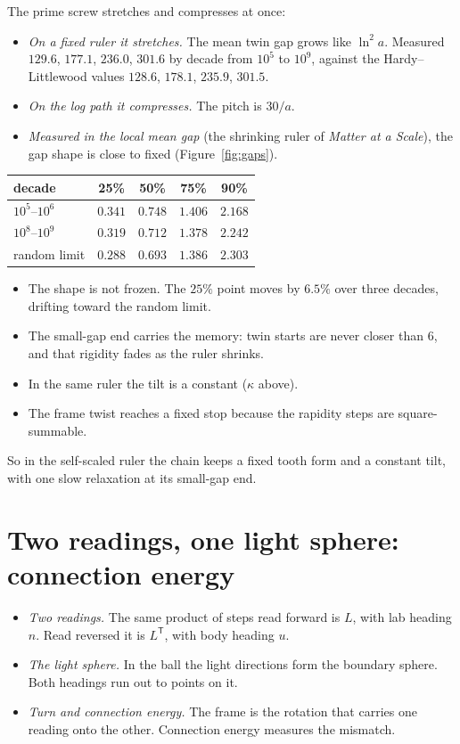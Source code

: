 \documentclass[11pt]{article}
\theoremstyle{definition}
\theoremstyle{remark}
\begin{document}
The prime screw stretches and compresses at once:
\begin{itemize}
\item \emph{On a fixed ruler it stretches.} The mean twin gap grows like $\ln^2a$. Measured $129.6$, $177.1$, $236.0$, $301.6$ by decade from $10^5$ to $10^9$, against the Hardy--Littlewood values $128.6$, $178.1$, $235.9$, $301.5$.
\item \emph{On the log path it compresses.} The pitch is $30/a$.
\item \emph{Measured in the local mean gap} (the shrinking ruler of \emph{Matter at a Scale}), the gap shape is close to fixed (Figure~\ref{fig:gaps}).
\end{itemize}

\begin{center}
\begin{tabular}{lcccc}
\toprule
decade & 25\% & 50\% & 75\% & 90\%\\
\midrule
$10^5$--$10^6$ & $0.341$ & $0.748$ & $1.406$ & $2.168$\\
$10^8$--$10^9$ & $0.319$ & $0.712$ & $1.378$ & $2.242$\\
random limit & $0.288$ & $0.693$ & $1.386$ & $2.303$\\
\bottomrule
\end{tabular}
\end{center}

\begin{itemize}
\item The shape is not frozen. The $25\%$ point moves by $6.5\%$ over three decades, drifting toward the random limit.
\item The small-gap end carries the memory: twin starts are never closer than $6$, and that rigidity fades as the ruler shrinks.
\item In the same ruler the tilt is a constant ($\kappa$ above).
\item The frame twist reaches a fixed stop because the rapidity steps are square-summable.
\end{itemize}
So in the self-scaled ruler the chain keeps a fixed tooth form and a constant tilt, with one slow relaxation at its small-gap end.

\section{Two readings, one light sphere: connection energy}

\begin{itemize}
\item \emph{Two readings.} The same product of steps read forward is $L$, with lab heading $n$. Read reversed it is $L^{\mathsf T}$, with body heading $u$.
\item \emph{The light sphere.} In the ball the light directions form the boundary sphere. Both headings run out to points on it.
\item \emph{Turn and connection energy.} The frame is the rotation that carries one reading onto the other. Connection energy measures the mismatch.
\end{itemize}
\end{document}
